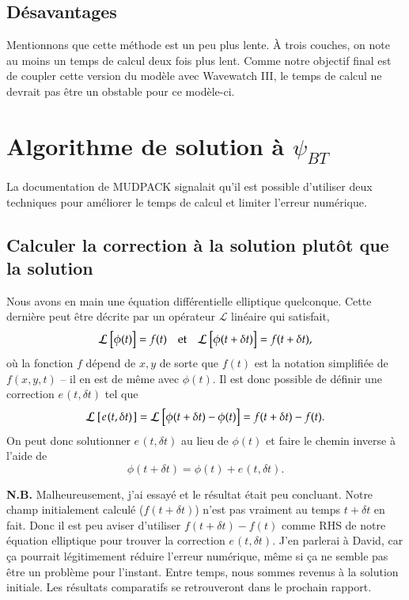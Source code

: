 \documentclass[10pt]{article}
\numberwithin{equation}{section}
\newcommand{\pt}{\hspace{1pt}}
\begin{document}
\subsection{Désavantages}
\label{sec:orgb0f0002}
Mentionnons que cette méthode est un peu plus lente.
À trois couches, on note au moins un temps de calcul deux fois plus lent.
Comme notre objectif final est de coupler cette version du modèle avec Wavewatch III, le temps de calcul ne devrait pas être un obstable pour ce modèle-ci. 



\section{Algorithme de solution à \(\psi_{BT}\)}
\label{sec:orga41d18f}

La documentation de MUDPACK signalait qu'il est possible d'utiliser deux techniques pour améliorer le temps de calcul et limiter l'erreur numérique.

\subsection{Calculer la correction à la solution plutôt que la solution}
\label{sec:org1a1f606}
Nous avons en main une équation différentielle elliptique quelconque.
Cette dernière peut être décrite par un opérateur \(\mathcal{L}\) linéaire qui satisfait,
\begin{align}
&&\mathcal{L}\ \qty[\phi(t)] = f(t) && \text{et} && \mathcal{L}\ \qty[\phi(t+\delta t)] = f(t+\delta t), &&
\end{align}
où la fonction \(f\) dépend de \(x,y\) de sorte que \(f(t)\) est la notation simplifiée de \(f(x,y,t)\) -- il en est de même avec \(\phi(t)\).
Il est donc possible de définir une correction \(e\pt(t,\delta t)\) tel que
\begin{align}
\mathcal{L}\ \qty[\pt e\pt(t,\delta t)\pt ] = \mathcal{L}\ \qty[ \phi(t+\delta t) - \phi(t) ] = f(t+\delta t) - f(t).
\end{align}
On peut donc solutionner \(e\pt(t,\delta t)\) au lieu de \(\phi(t)\) et faire le chemin inverse à l'aide de
\begin{equation}
\phi(t+\delta t) = \phi(t) + e\pt(t,\delta t).
\end{equation}

\textbf{N.B.} Malheureusement, j'ai essayé et le résultat était peu concluant.
Notre champ initialement calculé (\(f(t+\delta t)\)) n'est pas vraiment au temps \(t+\delta t\) en fait.
Donc il est peu aviser d'utiliser \(f(t+\delta t) - f(t)\) comme RHS de notre équation elliptique pour trouver la correction \(e\pt(t,\delta t)\).
J'en parlerai à David, car ça pourrait légitimement réduire l'erreur numérique, même si ça ne semble pas être un problème pour l'instant.
Entre temps, nous sommes revenus à la solution initiale.
Les résultats comparatifs se retrouveront dans le prochain rapport. 
\end{document}
